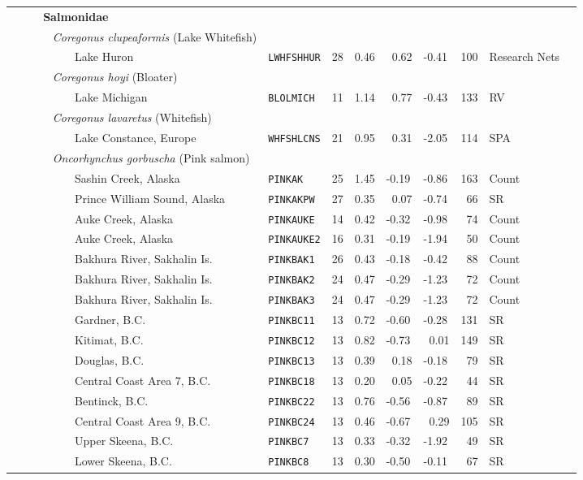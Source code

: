 \begin{flushleft}
\begin{tabular*}{7.1in}{llllllllll}
&{\bf~~~Salmonidae}&~&~&~&~&~&~&~  & \\ 
&{\it~~~~~Coregonus clupeaformis} (Lake Whitefish)&~&~&~&~&~&~&~  & \\ 
&~~~~~~~~~Lake Huron&{\tt LWHFSHHUR}&28&0.46&~0.62&-0.41&100&Research Nets  & \\ 
&{\it~~~~~Coregonus hoyi} (Bloater)&~&~&~&~&~&~&~  & \\ 
&~~~~~~~~~Lake Michigan&{\tt BLOLMICH}&11&1.14&~0.77&-0.43&133&RV  & \\ 
&{\it~~~~~Coregonus lavaretus} (Whitefish)&~&~&~&~&~&~&~  & \\ 
&~~~~~~~~~Lake Constance, Europe&{\tt WHFSHLCNS}&21&0.95&~0.31&-2.05&114&SPA  & \\ 
&{\it~~~~~Oncorhynchus gorbuscha} (Pink salmon)&~&~&~&~&~&~&~  & \\ 
&~~~~~~~~~Sashin Creek, Alaska&{\tt PINKAK}&25&1.45&-0.19&-0.86&163&Count  & \\ 
&~~~~~~~~~Prince William Sound, Alaska&{\tt PINKAKPW}&27&0.35&~0.07&-0.74&~66&SR  & \\ 
&~~~~~~~~~Auke Creek, Alaska&{\tt PINKAUKE}&14&0.42&-0.32&-0.98&~74&Count  & \\ 
&~~~~~~~~~Auke Creek, Alaska&{\tt PINKAUKE2}&16&0.31&-0.19&-1.94&~50&Count  & \\ 
&~~~~~~~~~Bakhura River, Sakhalin Is.&{\tt PINKBAK1}&26&0.43&-0.18&-0.42&~88&Count  & \\ 
&~~~~~~~~~Bakhura River, Sakhalin Is.&{\tt PINKBAK2}&24&0.47&-0.29&-1.23&~72&Count  & \\ 
&~~~~~~~~~Bakhura River, Sakhalin Is.&{\tt PINKBAK3}&24&0.47&-0.29&-1.23&~72&Count  & \\ 
&~~~~~~~~~Gardner, B.C.&{\tt PINKBC11}&13&0.72&-0.60&-0.28&131&SR  & \\ 
&~~~~~~~~~Kitimat, B.C.&{\tt PINKBC12}&13&0.82&-0.73&~0.01&149&SR  & \\ 
&~~~~~~~~~Douglas, B.C.&{\tt PINKBC13}&13&0.39&~0.18&-0.18&~79&SR  & \\ 
&~~~~~~~~~Central Coast Area 7, B.C.&{\tt PINKBC18}&13&0.20&~0.05&-0.22&~44&SR  & \\ 
&~~~~~~~~~Bentinck, B.C.&{\tt PINKBC22}&13&0.76&-0.56&-0.87&~89&SR  & \\ 
&~~~~~~~~~Central Coast Area 9, B.C.&{\tt PINKBC24}&13&0.46&-0.67&~0.29&105&SR  & \\ 
&~~~~~~~~~Upper Skeena, B.C.&{\tt PINKBC7}&13&0.33&-0.32&-1.92&~49&SR  & \\ 
&~~~~~~~~~Lower Skeena, B.C.&{\tt PINKBC8}&13&0.30&-0.50&-0.11&~67&SR  & \\ 

\end{tabular*}
\end{flushleft}
